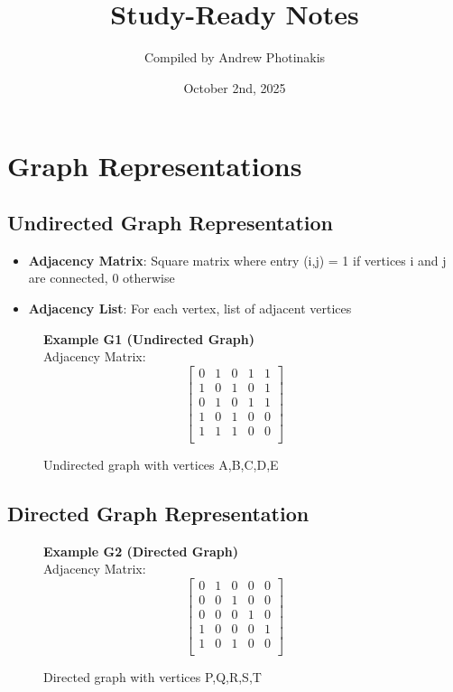 \documentclass[12pt]{article}
\title{\TOPICTITLE\\\large Study-Ready Notes}
\author{Compiled by Andrew Photinakis}
\date{October 2nd, 2025}
\begin{document}
\maketitle
\tableofcontents
\newpage

\section{Graph Representations}

\subsection{Undirected Graph Representation}

\begin{itemize}
    \item \textbf{Adjacency Matrix}: Square matrix where entry (i,j) = 1 if vertices i and j are connected, 0 otherwise
    \item \textbf{Adjacency List}: For each vertex, list of adjacent vertices
\end{itemize}

\begin{figure}[h]
    \centering
    \textbf{Example G1 (Undirected Graph)} \\
    Adjacency Matrix:
    \[
        \begin{bmatrix}
            0 & 1 & 0 & 1 & 1 \\
            1 & 0 & 1 & 0 & 1 \\
            0 & 1 & 0 & 1 & 1 \\
            1 & 0 & 1 & 0 & 0 \\
            1 & 1 & 1 & 0 & 0 \\
        \end{bmatrix}
    \]
    \caption{Undirected graph with vertices A,B,C,D,E}
\end{figure}

\subsection{Directed Graph Representation}

\begin{figure}[h]
    \centering
    \textbf{Example G2 (Directed Graph)} \\
    Adjacency Matrix:
    \[
        \begin{bmatrix}
            0 & 1 & 0 & 0 & 0 \\
            0 & 0 & 1 & 0 & 0 \\
            0 & 0 & 0 & 1 & 0 \\
            1 & 0 & 0 & 0 & 1 \\
            1 & 0 & 1 & 0 & 0 \\
        \end{bmatrix}
    \]
    \caption{Directed graph with vertices P,Q,R,S,T}
\end{figure}
\end{document}
